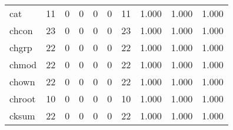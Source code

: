 \begin{longtable}{lp{1.3cm}p{1.3cm}p{1.3cm}p{1.3cm}p{1.3cm}p{1.3cm}p{1.3cm}p{1.3cm}p{1.3cm}}
cat       &                     11 &                                             0 &                                            0 &                                           0 &                                            0 &                                         11 &                                1.000 &                                  1.000 &                                1.000 \\
chcon     &                     23 &                                             0 &                                            0 &                                           0 &                                            0 &                                         23 &                                1.000 &                                  1.000 &                                1.000 \\
chgrp     &                     22 &                                             0 &                                            0 &                                           0 &                                            0 &                                         22 &                                1.000 &                                  1.000 &                                1.000 \\
chmod     &                     22 &                                             0 &                                            0 &                                           0 &                                            0 &                                         22 &                                1.000 &                                  1.000 &                                1.000 \\
chown     &                     22 &                                             0 &                                            0 &                                           0 &                                            0 &                                         22 &                                1.000 &                                  1.000 &                                1.000 \\
chroot    &                     10 &                                             0 &                                            0 &                                           0 &                                            0 &                                         10 &                                1.000 &                                  1.000 &                                1.000 \\
cksum     &                     22 &                                             0 &                                            0 &                                           0 &                                            0 &                                         22 &                                1.000 &                                  1.000 &                                1.000 \\

\end{longtable}
